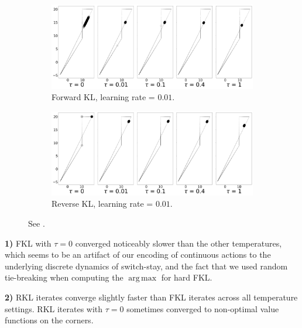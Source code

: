 \documentclass[twoside,11pt]{article}
\DeclareMathOperator*{\argmax}{arg\,max}
\begin{document}
\begin{figure}[!htb]
    \centering
    \begin{subfigure}{0.6\linewidth}
    \centering
    \includegraphics[width=\columnwidth]{figs/continuous-switch-stay/notlearnQ/polytope_forward_optim=rmsprop_lr=0.01.png}
    \caption{Forward KL, learning rate = $0.01$.}
    \label{fig:cont-switch-stay-forward-0.01}
  \end{subfigure}%
  \begin{subfigure}[b]{0.6\linewidth}
        \centering
        \includegraphics[width=\columnwidth]{figs/continuous-switch-stay/notlearnQ/polytope_reverse_optim=rmsprop_lr=0.01.png}
        \caption{Reverse KL, learning rate = $0.01$.}
        \label{fig:cont-switch-stay-reverse-0.01}
  \end{subfigure}
  \caption{See .}
  \label{fig:cont-ss-poly-0.01}
\end{figure}

\textbf{1)} FKL with $\tau = 0$ converged noticeably slower than the other temperatures, which seems to be an artifact of our encoding of continuous actions to the underlying discrete dynamics of switch-stay, and the fact that we used random tie-breaking when computing the $\argmax$ for hard FKL. 

\textbf{2)} RKL iterates converge slightly faster than FKL iterates across all temperature settings. RKL iterates with $\tau = 0$ sometimes converged to non-optimal value functions on the corners. 
\end{document}
